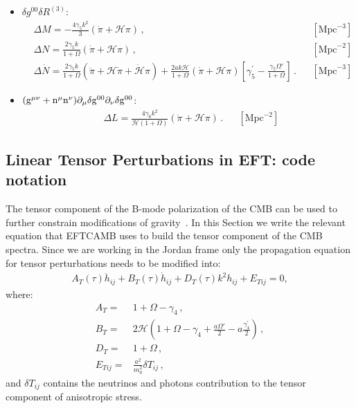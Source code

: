 \documentclass[prd,nofootinbib,showpacs]{revtex4}
\def\l{\left}
\def\r{\right}
\def\f{\frac}
\def\hub{{\mathcal H}}
\begin{document}
{\begin{itemize}
{\begin{align}
%
\Delta{ U} =& \f{\gamma_4}{2(1+\Omega)} \, . & &  [\,\,]  \,
\end{align}}
%
\item[] \underline{$\delta g^{00}\delta R^{(3)}$}:\\
{\small
\begin{align}\label{Eq:ContribGamma5}
%
&\Delta{ M}=-\f{4\gamma_5k^2}{3}\l(\dot{\pi}+\hub\pi \r) \, , & &  [\text{Mpc}^{-3}] \, \nonumber\\
%
&\Delta{ N}=\f{2\gamma_5k}{1+\Omega}\left(\dot{\pi}+\hub\pi\right) \, , & &  [\text{Mpc}^{-2}] \, \nonumber\\
%
&\Delta\dot{N} = \f{2\gamma_5k}{1+\Omega}\l(\ddot{\pi}+\hub\dot{\pi}+\dot{\hub}\pi\r)+\f{2ak\hub}{1+\Omega}\l(\dot{\pi}+\hub\pi\r)\l[ \gamma_5^\prime-\f{\gamma_5\Omega'}{1+\Omega}\r]  \, .& &  [\text{Mpc}^{-3}] \,
\end{align}}
%
\item[] \underline{ $\rm(g^{\mu\nu}+n^\mu n^\nu)\partial_\mu\delta g^{00}\partial_\nu \delta g^{00}$}:\\
{\small
\begin{align}\label{Eq:ContribGamma6}
%
&\Delta{ L}= \f{4\gamma_6k^2}{\hub(1+\Omega)}\l(\dot{\pi}+\hub\pi\r) \, . & &  [\text{Mpc}^{-2}] \,
\end{align}}
\end{itemize}
%
\subsection{Linear Tensor Perturbations in EFT: code notation}\label{SubSec:TensorModes}
%
The tensor component of the B-mode polarization of the CMB can be used to further constrain modifications of gravity~\cite{Amendola:2014wma,Raveri:2014eea}.
In this Section we write the relevant equation that EFTCAMB uses to build the tensor component of the CMB spectra.
Since we are working in the Jordan frame only the propagation equation for tensor perturbations needs to be modified into:
%
\begin{align} \label{Eq:TensorEquation}
A_{T}(\tau) \ddot{h}_{ij} +B_{T}(\tau) \dot{h}_{ij} +D_{T}(\tau) k^2 h_{ij}+ E_{Tij} = 0,
\end{align}
%
where:
\begin{align}
A_{T} =& 1+\Omega -\gamma_4 \,,\nonumber \\
B_{T} =& 2\hub \left(1 + \Omega -\gamma_4 +\frac{a\Omega'}{2} -a \f{\gamma_4^\prime}{2}	 \right)\,, \nonumber \\
D_{T} =& 1+\Omega\,,\nonumber \\
E_{Tij}=& \frac{a^2}{m_0^2} \delta T _{ij} \,,
\end{align}
%
and $\delta T_{ij}$ contains the neutrinos and photons contribution to the tensor component of anisotropic stress.
%
}
\end{document}
